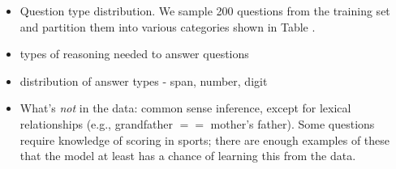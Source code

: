 \begin{itemize}
    \item Question type distribution. 
    We sample 200 questions from the training set and partition them into various categories shown in Table .\\
   
    \item types of reasoning needed to answer questions 
    \item distribution of answer types - span, number, digit
    \item What's \emph{not} in the data: common sense inference, except for lexical relationships (e.g., grandfather $==$ mother's father).  Some questions require knowledge of scoring in sports; there are enough examples of these that the model at least has a chance of learning this from the data.
\end{itemize}

